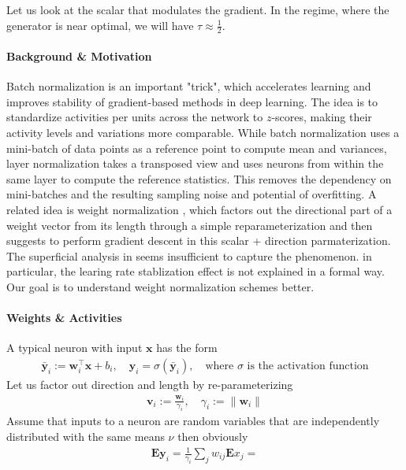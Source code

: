 \documentclass{article}
\newcommand{\E}{{\mathbf E}}
\newcommand{\x}{{\mathbf x}}
\newcommand{\y}{{\mathbf y}}
\newcommand{\w}{{\mathbf w}}
\renewcommand{\v}{{\mathbf v}}
\begin{document}
Let us look at the scalar that modulates the gradient. In the regime, where the generator is near optimal, we will have $\tau \approx \frac 12$. 
 


\newpage




\paragraph*{Background \& Motivation} 

Batch normalization \cite{ioffe2015batch} is an important "trick", which accelerates learning and improves stability of gradient-based methods in deep learning. The idea is to standardize activities per units across the network to $z$-scores, making their activity levels and variations more comparable.  While batch normalization uses a mini-batch of data points as a reference point to compute mean and variances, layer normalization \cite{ba2016layer} takes a transposed view and uses neurons from within the same layer to compute the reference statistics. This removes the dependency on mini-batches and the resulting sampling noise and potential of overfitting. A related idea is weight normalization \cite{salimans2016weight}, which factors out the directional part of a weight vector from its length through a simple reparameterization and then suggests to perform gradient descent in this scalar + direction parmaterization. The superficial analysis in \cite[Section 2.1]{salimans2016weight} seems insufficient to capture the phenomenon. in particular, the learing rate stablization effect is not explained in a formal way. Our goal is to understand weight normalization schemes better.

\paragraph*{Weights \& Activities}

A typical neuron with input $\x$ has the form 
\begin{align}
\bar \y_i := \w_i^\top \x + b_i, \quad 
\y_i = \sigma \left( \bar \y_i \right), \quad \text{where $\sigma$ is the activation function} 
\end{align}
Let us factor out direction and length by re-parameterizing
\begin{align}
\v_i := \frac{ \w_i}{\gamma_i}, \quad \gamma_i := \| \w_i \|
\end{align}
Assume that inputs to a neuron are random variables that are independently distributed with the same means $\nu$ then obviously 
\begin{align}
\E \y_i = \frac{1}{\gamma_i} \sum_j w_{ij} \E x_j  = 
\end{align}
\end{document}
